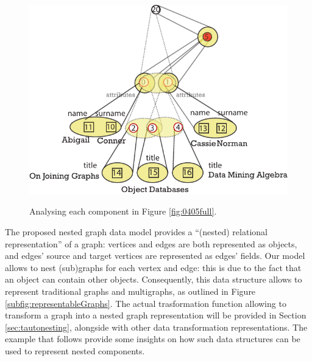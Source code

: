 \begin{figure}
\begin{minipage}{.5\textwidth}
	\label{fig:0403Expressions}
\end{minipage} 
\medskip
\centering
\begin{minipage}{.8\textwidth}
	\centering
	\includegraphics{fig/04model/0404Attributes_1}
	\label{fig:0404Attributes}
\end{minipage}\quad 
	\caption{Analysing each component in Figure \vref{fig:0405full}. }
	\label{fig:nestingexample}
\end{figure}
The proposed nested graph data model provides a ``(nested) relational representation'' of a graph: vertices and edges are both represented as objects, and edges' source and target vertices are represented as edges' fields. Our model allows to nest (sub)graphs for each vertex and edge: this is due to the fact that an object can contain other objects. Consequently, this data structure allows to represent traditional graphs and multigraphs, as outlined in Figure \vref{subfig:representableGraphs}. The actual trasformation function allowing to transform a graph into a nested graph representation will be provided in Section \vref{sec:tautonesting}, alongside with other data transformation representations.
The example that follows provide some insights on how such data structures can be used to represent nested components.

